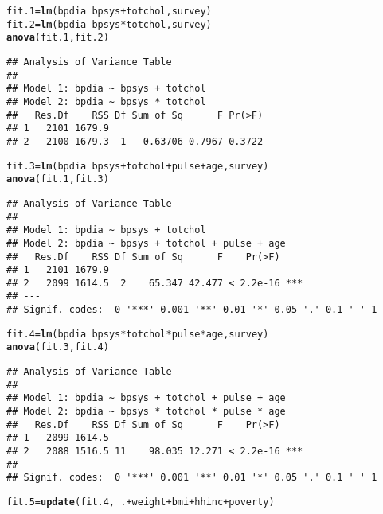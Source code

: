 \documentclass{article}\usepackage[]{graphicx}\usepackage[]{color}
\makeatletter
\newcommand{\hlopt}[1]{\textcolor[rgb]{0,0,0}{#1}}%
\newcommand{\hlstd}[1]{\textcolor[rgb]{0.345,0.345,0.345}{#1}}%
\newcommand{\hlkwb}[1]{\textcolor[rgb]{0.69,0.353,0.396}{#1}}%
\newcommand{\hlkwd}[1]{\textcolor[rgb]{0.737,0.353,0.396}{\textbf{#1}}}%
\newenvironment{kframe}{%
 \def\at@end@of@kframe{}%
 \ifinner\ifhmode%
  \def\at@end@of@kframe{\end{minipage}}%
  \begin{minipage}{\columnwidth}%
 \fi\fi%
 \def\FrameCommand##1{\hskip\@totalleftmargin \hskip-\fboxsep
 \colorbox{shadecolor}{##1}\hskip-\fboxsep
     \hskip-\linewidth \hskip-\@totalleftmargin \hskip\columnwidth}%
 \MakeFramed {\advance\hsize-\width
   \@totalleftmargin\z@ \linewidth\hsize
   \@setminipage}}%
 {\par\unskip\endMakeFramed%
 \at@end@of@kframe}
\newenvironment{knitrout}{}{} %
\makeatother
\begin{document}
\begin{knitrout}
\color{fgcolor}\begin{kframe}
\begin{alltt}
\hlstd{fit.1} \hlkwb{=} \hlkwd{lm}\hlstd{(bpdia} \hlopt{~} \hlstd{bpsys}\hlopt{+}\hlstd{totchol,survey)}
\hlstd{fit.2} \hlkwb{=} \hlkwd{lm}\hlstd{(bpdia} \hlopt{~} \hlstd{bpsys}\hlopt{*}\hlstd{totchol,survey)}
\hlkwd{anova}\hlstd{(fit.1,fit.2)}
\end{alltt}
\begin{verbatim}
## Analysis of Variance Table
## 
## Model 1: bpdia ~ bpsys + totchol
## Model 2: bpdia ~ bpsys * totchol
##   Res.Df    RSS Df Sum of Sq      F Pr(>F)
## 1   2101 1679.9                           
## 2   2100 1679.3  1   0.63706 0.7967 0.3722
\end{verbatim}
\begin{alltt}
\hlstd{fit.3} \hlkwb{=} \hlkwd{lm}\hlstd{(bpdia} \hlopt{~} \hlstd{bpsys} \hlopt{+} \hlstd{totchol} \hlopt{+} \hlstd{pulse} \hlopt{+} \hlstd{age, survey)}
\hlkwd{anova}\hlstd{(fit.1,fit.3)}
\end{alltt}
\begin{verbatim}
## Analysis of Variance Table
## 
## Model 1: bpdia ~ bpsys + totchol
## Model 2: bpdia ~ bpsys + totchol + pulse + age
##   Res.Df    RSS Df Sum of Sq      F    Pr(>F)    
## 1   2101 1679.9                                  
## 2   2099 1614.5  2    65.347 42.477 < 2.2e-16 ***
## ---
## Signif. codes:  0 '***' 0.001 '**' 0.01 '*' 0.05 '.' 0.1 ' ' 1
\end{verbatim}
\begin{alltt}
\hlstd{fit.4} \hlkwb{=} \hlkwd{lm}\hlstd{(bpdia} \hlopt{~} \hlstd{bpsys}\hlopt{*}\hlstd{totchol}\hlopt{*}\hlstd{pulse}\hlopt{*}\hlstd{age,survey)}
\hlkwd{anova}\hlstd{(fit.3,fit.4)}
\end{alltt}
\begin{verbatim}
## Analysis of Variance Table
## 
## Model 1: bpdia ~ bpsys + totchol + pulse + age
## Model 2: bpdia ~ bpsys * totchol * pulse * age
##   Res.Df    RSS Df Sum of Sq      F    Pr(>F)    
## 1   2099 1614.5                                  
## 2   2088 1516.5 11    98.035 12.271 < 2.2e-16 ***
## ---
## Signif. codes:  0 '***' 0.001 '**' 0.01 '*' 0.05 '.' 0.1 ' ' 1
\end{verbatim}
\begin{alltt}
\hlstd{fit.5} \hlkwb{=} \hlkwd{update}\hlstd{(fit.4,} \hlopt{~}\hlstd{.} \hlopt{+} \hlstd{weight} \hlopt{+} \hlstd{bmi} \hlopt{+} \hlstd{hhinc} \hlopt{+} \hlstd{poverty)}
\end{alltt}
\end{kframe}
\end{knitrout}
\clearpage
\end{document}
